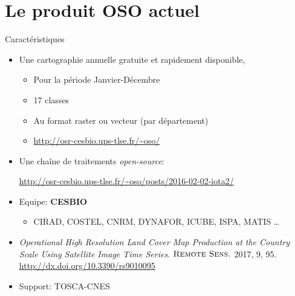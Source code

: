 \documentclass[pressentation,10pt,aspectratio=1610, xcolor=table]{beamer}
\begin{document}
\section{Le produit OSO actuel}
\label{sec:org7805502}
\begin{frame}[label={sec:orgee682cf}]{Caractéristiques}
\begin{itemize}
\item Une cartographie annuelle gratuite et rapidement disponible,
\begin{itemize}
\item Pour la période \og Janvier-Décembre\fg
\item 17 classes
\item Au format raster ou vecteur (par département)
\item \url{http://osr-cesbio.ups-tlse.fr/\~oso/}
\end{itemize}
\item Une chaîne de traitements \emph{open-source}:
\begin{center}
\url{http://osr-cesbio.ups-tlse.fr/\~oso/posts/2016-02-02-iota2/} 
\end{center}
\item Equipe: \textbf{CESBIO}
\begin{itemize}
\item CIRAD, COSTEL, CNRM, DYNAFOR, ICUBE, ISPA, MATIS \ldots{}
\end{itemize}
\item \emph{Operational High Resolution Land Cover Map Production at the Country
Scale Using Satellite Image  Time Series}.  \(\textsc{Remote Sens.}\)
2017, 9, 95. \url{http://dx.doi.org/10.3390/rs9010095}
\item Support: TOSCA-CNES
\end{itemize}
\end{frame}
\end{document}

